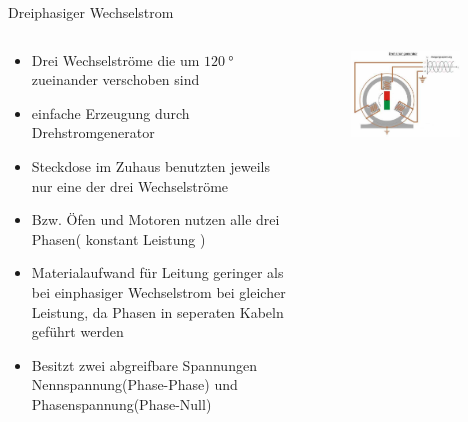 \documentclass[aspectratio=1610, professionalfonts, 9pt]{beamer}
\begin{document}
\begin{frame}{Dreiphasiger Wechselstrom}
  \begin{columns}
    \begin{column}{0.5\textwidth}
\begin{itemize}
  \item Drei Wechselströme die um $\SI{120}{\degree}$ zueinander verschoben sind
  \item einfache Erzeugung durch Drehstromgenerator
  \item Steckdose im Zuhaus benutzten jeweils nur eine der drei Wechselströme
  \item Bzw. Öfen und Motoren nutzen alle drei Phasen( konstant Leistung )
  \item Materialaufwand für Leitung geringer als bei einphasiger Wechselstrom bei gleicher Leistung,
   da Phasen in seperaten Kabeln geführt werden
  \item Besitzt zwei abgreifbare Spannungen  Nennspannung(Phase-Phase) und Phasenspannung(Phase-Null)
\end{itemize}
\end{column}
\begin{column}{0.5\textwidth}
  \begin{figure}
\includegraphics[width=0.9\textwidth]{images/Drehstromgenerator.jpg}
\end{figure}
\end{column}
\end{columns}
\end{frame}
\end{document}
